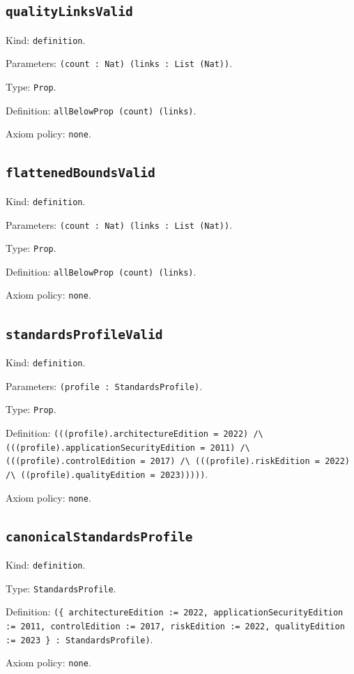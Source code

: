 \documentclass[11pt]{article}
\begin{document}
\subsection*{\texttt{qualityLinksValid}}
\noindent Kind: \texttt{definition}.\par
\noindent Parameters: \texttt{(count : Nat) (links : List (Nat))}.\par
\noindent Type: \texttt{Prop}.\par
\noindent Definition: \texttt{allBelowProp (count) (links)}.\par
\noindent Axiom policy: \texttt{none}.\par
\subsection*{\texttt{flattenedBoundsValid}}
\noindent Kind: \texttt{definition}.\par
\noindent Parameters: \texttt{(count : Nat) (links : List (Nat))}.\par
\noindent Type: \texttt{Prop}.\par
\noindent Definition: \texttt{allBelowProp (count) (links)}.\par
\noindent Axiom policy: \texttt{none}.\par
\subsection*{\texttt{standardsProfileValid}}
\noindent Kind: \texttt{definition}.\par
\noindent Parameters: \texttt{(profile : StandardsProfile)}.\par
\noindent Type: \texttt{Prop}.\par
\noindent Definition: \texttt{(((profile).architectureEdition = 2022) /\textbackslash{} (((profile).applicationSecurityEdition = 2011) /\textbackslash{} (((profile).controlEdition = 2017) /\textbackslash{} (((profile).riskEdition = 2022) /\textbackslash{} ((profile).qualityEdition = 2023)))))}.\par
\noindent Axiom policy: \texttt{none}.\par
\subsection*{\texttt{canonicalStandardsProfile}}
\noindent Kind: \texttt{definition}.\par
\noindent Type: \texttt{StandardsProfile}.\par
\noindent Definition: \texttt{(\{ architectureEdition := 2022, applicationSecurityEdition := 2011, controlEdition := 2017, riskEdition := 2022, qualityEdition := 2023 \} : StandardsProfile)}.\par
\noindent Axiom policy: \texttt{none}.\par
\end{document}
